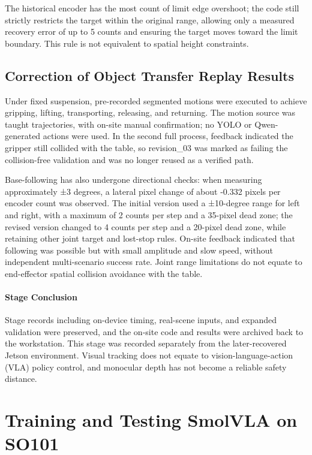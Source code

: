 The historical encoder has the most count of limit edge overshoot; the code still strictly restricts the target within the original range, allowing only a measured recovery error of up to 5 counts and ensuring the target moves toward the limit boundary. This rule is not equivalent to spatial height constraints.


\subsection{Correction of Object Transfer Replay Results}\label{s06-detail-11}

Under fixed suspension, pre-recorded segmented motions were executed to achieve gripping, lifting, transporting, releasing, and returning. The motion source was taught trajectories, with on-site manual confirmation; no YOLO or Qwen-generated actions were used. In the second full process, feedback indicated the gripper still collided with the table, so revision\_03 was marked as failing the collision-free validation and was no longer reused as a verified path.

Base-following has also undergone directional checks: when measuring approximately ±3 degrees, a lateral pixel change of about -0.332 pixels per encoder count was observed. The initial version used a ±10-degree range for left and right, with a maximum of 2 counts per step and a 35-pixel dead zone; the revised version changed to 4 counts per step and a 20-pixel dead zone, while retaining other joint target and lost-stop rules. On-site feedback indicated that following was possible but with small amplitude and slow speed, without independent multi-scenario success rate. Joint range limitations do not equate to end-effector spatial collision avoidance with the table.


\paragraph{Stage Conclusion} Stage records including on-device timing, real-scene inputs, and expanded validation were preserved, and the on-site code and results were archived back to the workstation. This stage was recorded separately from the later-recovered Jetson environment. Visual tracking does not equate to vision-language-action (VLA) policy control, and monocular depth has not become a reliable safety distance.


\FloatBarrier

\section{Training and Testing SmolVLA on SO101}

